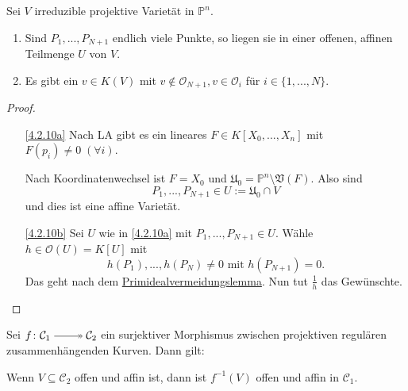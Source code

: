 \documentclass[a4paper,12pt,index=toc]{scrbook}
\theoremstyle{keinenummern} %
\def\CC{\mathcal{C}}
\def\V{\mathfrak{V}}
\def\O{\mathcal{O}}
\def\P{\mathbb{P}}
\def\U{\mathfrak{U}}
\renewcommand{\dotsc}{\ensuremath{\!...}}
\begin{document}

\begin{bem}\label{4.2.10}
Sei $V$ irreduzible projektive Varietät in $\P^n$.
\begin{enumerate}
  \item{} Sind $P_1,\dotsc,P_{N+1}$ endlich viele Punkte, so liegen sie in einer offenen, affinen Teilmenge $U$  von $V$.
  \item{} Es gibt ein $v\in K(V)$ mit $v\notin \O_{N+1}, v\in \O_i$ für  $i\in \{1,\dotsc,N\}$.
\end{enumerate}
\end{bem}
\begin{proof}
\begin{enumerate}
  \item[\ref{4.2.10a}] Nach LA gibt es ein lineares $F \in K[X_0,\dotsc,X_n]$ mit $F(p_i)\neq 0\; (\forall i)$. 

Nach Koordinatenwechsel ist $F=X_0$ und $\U_0=\P^n\setminus \V(F)$. Also sind \[P_1,\dotsc,P_{N+1}\in U:=\U_0\cap V\] und dies ist eine affine Varietät.
  \item[\ref{4.2.10b}] Sei $U$ wie in \ref{4.2.10a} mit $P_1,\dotsc,P_{N+1}\in U$. Wähle $h\in \O(U)=K[U]$ mit \[h(P_1),\dotsc,h(P_N)\neq 0\text{ mit }h(P_{N+1})=0.\] Das geht nach dem \hyperref[pivl]{Primidealvermeidungslemma}. Nun tut $\frac{1}{h}$ das Gewünschte.
 \end{enumerate}
\end{proof}

\begin{lem}\label{4.2.6}
Sei $f\colon\CC_{1}\surj\CC_{2}$ ein surjektiver Morphismus zwischen projektiven regulären zusammenhängenden Kurven. Dann gilt:

Wenn $V\subseteq\CC_{2}$ offen und affin ist, dann ist $f^{-1}(V)$ offen und affin in $\CC_{1}$.
\end{lem}
\end{document}
